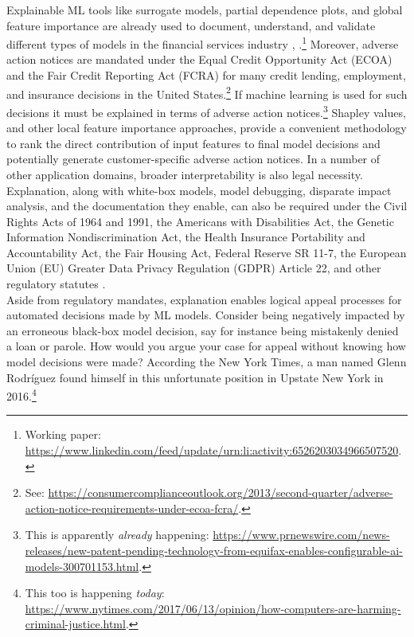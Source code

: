 \documentclass[fleqn]{article}
\begin{document}
Explainable ML tools like surrogate models, partial dependence plots, and global feature importance are already used to document, understand, and validate different types of models in the financial services industry \cite{lime-sup}, \cite{wf_xnn}.\footnote{Working paper: \url{https://www.linkedin.com/feed/update/urn:li:activity:6526203034966507520}.} Moreover, adverse action notices are mandated under the Equal Credit Opportunity Act (ECOA) and the Fair Credit Reporting Act (FCRA) for many credit lending, employment, and insurance decisions in the United States.\footnote{See: \url{https://consumercomplianceoutlook.org/2013/second-quarter/adverse-action-notice-requirements-under-ecoa-fcra/}.} If machine learning is used for such decisions it must be explained in terms of adverse action notices.\footnote{This is apparently \textit{already} happening: \url{https://www.prnewswire.com/news-releases/new-patent-pending-technology-from-equifax-enables-configurable-ai-models-300701153.html}.} Shapley values, and other local feature importance approaches, provide a convenient methodology to rank the direct contribution of input features to final model decisions and potentially generate customer-specific adverse action notices. In a number of other application domains, broader interpretability is also legal necessity. Explanation, along with white-box models, model debugging, disparate impact analysis, and the documentation they enable, can also be required under the Civil Rights Acts of 1964 and 1991, the Americans with Disabilities Act, the Genetic Information Nondiscrimination Act, the Health Insurance Portability and Accountability Act, the Fair Housing Act, Federal Reserve SR 11-7, the European Union (EU) Greater Data Privacy Regulation (GDPR) Article 22, and other regulatory statutes \cite{ff_interpretability}.\\

Aside from regulatory mandates, explanation enables logical appeal processes for automated decisions made by ML models. Consider being negatively impacted by an erroneous black-box model decision, say for instance being mistakenly denied a loan or parole. How would you argue your case for appeal without knowing how model decisions were made? According the New York Times, a man named Glenn Rodr\'iguez found himself in this unfortunate position in Upstate New York in 2016.\footnote{This too is happening \textit{today}: \url{https://www.nytimes.com/2017/06/13/opinion/how-computers-are-harming-criminal-justice.html}.}\\
\end{document}
